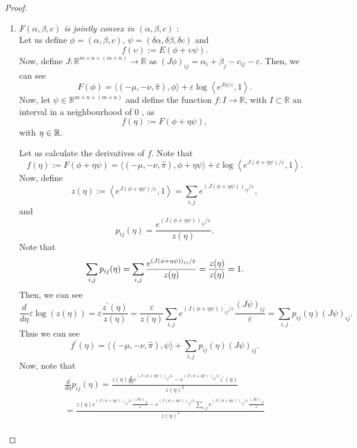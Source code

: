 \begin{proof}
	\begin{enumerate}[label=(\roman*)]
		\item \textit{$F(\alpha, \beta, c)$ is jointly convex in $(\alpha, \beta, c)$} : \\
		Let us define $\phi = (\alpha, \beta, c)$, $\psi = (\delta \alpha, \delta \beta, \delta c)$ and 
		\begin{equation*}
			f(\upsilon) := E(\phi + \upsilon \psi).  
		\end{equation*}	
		Now, define $J: \mathbb{R}^{m \times n \times(m \times n)} \rightarrow \mathbb{R}$ as $(J \phi)_{i j}=\alpha_{i}+\beta_{j}-c_{i j}-\varepsilon$. Then, we can see
		\[ F(\phi)=\langle(-\mu,-\nu, \hat{\pi}), \phi\rangle+\varepsilon \log \left\langle e^{J \phi / \varepsilon}, 1\right\rangle .\]
		Now, let $\psi \in \mathbb{R}^{m \times n \times(m \times n)}$ and define the function $f: I \rightarrow \mathbb{R}$, with $I \subset \mathbb{R}$ an interval in a neighbourhood of 0 , as
		\[ f(\eta):=F(\phi+\eta \psi) ,\]
		with $\eta \in \mathbb{R}$. \par 
		Let us calculate the derivatives of $f$. Note that
		\[ f(\eta):=F(\phi+\eta \psi)=\langle(-\mu,-\nu, \hat{\pi}), \phi+\eta \psi\rangle+\varepsilon \log \left\langle e^{J(\phi+\eta \psi) / \varepsilon}, 1\right\rangle. \]
		Now, define
		\[ z(\eta):=\left\langle e^{J(\phi+\eta \psi) / \varepsilon}, 1\right\rangle = \sum_{i, j} e^{(J(\phi+\eta \psi))_{i j} / \varepsilon}, \]
		and
		\[ p_{i j}(\eta)=\frac{e^{(J(\phi+\eta \psi))_{i j} / \varepsilon}}{z(\eta)}. \]
		Note that 
		\[\sum_{i,j} p_{i j}(\eta) = \sum_{i,j} \frac{e^{(J(\phi+\eta \psi))_{i j} / \varepsilon}}{z(\eta)} = \frac{z(\eta)}{z(\eta)} = 1. \]
		Then, we can see
		\[ \frac{d}{d \eta} \varepsilon \log (z(\eta))=\varepsilon \frac{z^{\prime}(\eta)}{z(\eta)}=\frac{\varepsilon}{z(\eta)} \sum_{i, j} e^{(J(\phi+\eta \psi))_{i j} / \varepsilon} \frac{(J \psi)_{i j}}{\varepsilon}=\sum_{i, j} p_{i j}(\eta)(J \psi)_{i j}. \]
		Thus we can see
		\[f^{\prime}(\eta)=\langle(-\mu,-\nu, \hat{\pi}), \psi\rangle+\sum_{i, j} p_{i j}(\eta)(J \psi)_{i j} .\]
		Now, note that
		\[\begin{gathered}
			\frac{d}{d \eta} p_{i j}(\eta)=\frac{z(\eta) \frac{d}{d \eta} e^{(J(\phi+\eta \psi))_{i j} / \varepsilon}-e^{(J(\phi+\eta \psi))_{i j} / \varepsilon} z^{\prime}(\eta)}{z(\eta)^{2}} \\
			=\frac{z(\eta) e^{(J(\phi+\eta \psi))_{i j} / \varepsilon} \frac{(J \psi)_{i j}}{\varepsilon}-e^{(J(\phi+\eta \psi))_{i j} / \varepsilon} \sum_{i, j} e^{(J(\phi+\eta \psi))_{i j} / \varepsilon} \frac{(J \psi)_{i j}}{\varepsilon}}{z(\eta)^{2}} \\

\end{gathered}\]
\end{enumerate}
\end{proof}
